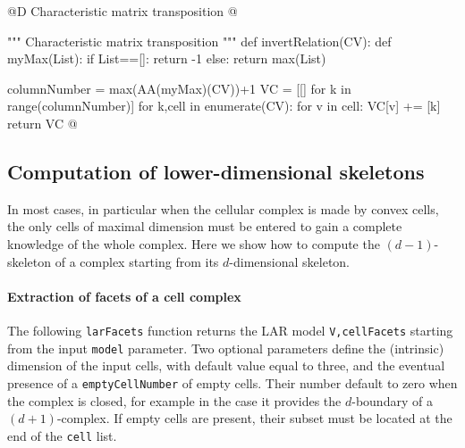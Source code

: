 \documentclass[11pt,oneside]{article}    %
\begin{document}
@D Characteristic matrix transposition
@{""" Characteristic matrix transposition """
def invertRelation(CV):    
    def myMax(List):
        if List==[]:  return -1
        else:  return max(List)
            
    columnNumber = max(AA(myMax)(CV))+1
    VC = [[] for k in range(columnNumber)]
    for k,cell in enumerate(CV):
        for v in cell: VC[v] += [k]
    return VC
@}


\subsection{Computation of lower-dimensional skeletons}

In most cases, in particular when the cellular complex is made by convex cells, the only cells of maximal dimension must be entered to gain a complete knowledge of the whole complex.
Here we show how to compute the $(d-1)$-skeleton of a complex starting from its $d$-dimensional skeleton.

\paragraph{Extraction of facets of a cell complex} 

The following \texttt{larFacets} function returns the LAR model \texttt{V,cellFacets} starting from the input \texttt{model} parameter. Two optional parameters define the (intrinsic) dimension of the input cells, with default value equal to three, and the eventual presence of a \texttt{emptyCellNumber} of empty cells. Their number default to zero when the complex is closed, for example in the case it provides the $d$-boundary of a $(d+1)$-complex. If empty cells are present, their subset must be located at the end of the \texttt{cell} list.
\end{document}
